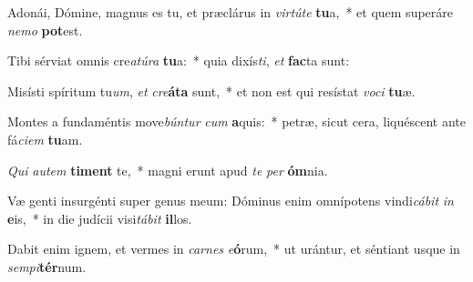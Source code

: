 \item Adonái, Dómine, magnus es tu, et præclárus in \textit{vir}\textit{tú}\textit{te} \textbf{tu}a,~* et quem superáre \textit{ne}\textit{mo} \textbf{pot}est.
\item Tibi sérviat omnis cre\textit{a}\textit{tú}\textit{ra} \textbf{tu}a:~* quia dixís\textit{ti}, \textit{et} \textbf{fac}ta sunt:
\item Misísti spíritum tu\textit{um}, \textit{et} \textit{cre}\textbf{á}\textbf{ta} sunt,~* et non est qui resístat \textit{vo}\textit{ci} \textbf{tu}æ.
\item Montes a fundaméntis move\textit{bún}\textit{tur} \textit{cum} \textbf{a}quis:~* petræ, sicut cera, liquéscent ante fá\textit{ci}\textit{em} \textbf{tu}am.
\item \textit{Qui} \textit{au}\textit{tem} \textbf{ti}\textbf{ment} te,~* magni erunt apud \textit{te} \textit{per} \textbf{óm}nia.
\item Væ genti insurgénti super genus meum: Dóminus enim omnípotens vindi\textit{cá}\textit{bit} \textit{in} \textbf{e}is,~* in die judícii visi\textit{tá}\textit{bit} \textbf{il}los.
\item Dabit enim ignem, et vermes in \textit{car}\textit{nes} \textit{e}\textbf{ó}rum,~* ut urántur, et séntiant usque in \textit{sem}\textit{pi}\textbf{tér}num.
